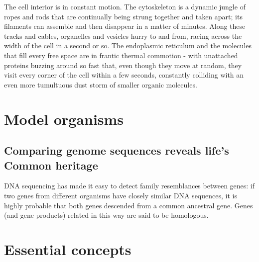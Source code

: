 The cell interior is in constant motion. The cytoskeleton is a dynamic
jungle of ropes and rods that are continually being strung together and
taken apart; its filaments can assemble and then disappear in a matter
of minutes. Along these tracks and cables, organelles and
vesicles hurry to and from, racing across the width of the cell in a second or so. The
endoplasmic reticulum and the molecules that fill every free space are in
frantic thermal commotion - with unattached proteins buzzing around
so fast that, even though they move at random, they visit every corner
of the cell within a few seconds, constantly colliding with an even more
tumultuous dust storm of smaller organic molecules.

\section{Model organisms}

\subsection{Comparing genome sequences reveals life’s Common heritage}

DNA sequencing has made it easy to detect family resemblances between
genes: if two genes from different organisms have closely similar DNA
sequences, it is highly probable that both genes descended from a common
ancestral gene. Genes (and gene products) related in this way are
said to be homologous.

\section{Essential concepts}

